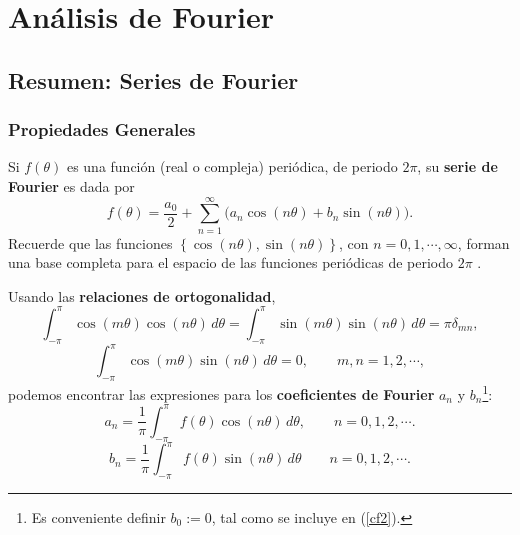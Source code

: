 \chapter{Análisis de Fourier}
\setcounter{page}{1}


\section{Resumen: Series de Fourier}

\subsection{Propiedades Generales} Si $f(\theta)$ es una función (real o compleja) periódica, de periodo $2\pi$, su \textbf{serie de Fourier} es dada por
\begin{equation}\label{sf1}
 f(\theta) =\frac{a_0}{2}  +\sum_{n=1}^\infty 
\big(a_n\cos(n\theta) + b_n\sin(n\theta)\big).
\end{equation}
Recuerde que las funciones $\left\lbrace\cos(n\theta),\sin(n\theta)\right\rbrace$, con $n=0,1,\cdots,\infty$, forman una base completa para el espacio de las funciones periódicas de periodo $2\pi$ \cite{Arfken}.

Usando las \textbf{relaciones de ortogonalidad}, 
\begin{equation}
\int_{-\pi}^\pi\cos(m\theta)\cos(n\theta)\,d\theta=\int_{-\pi}^\pi\sin(m\theta)\sin(n\theta)\,d\theta=\pi\delta_{mn},\label{eq:ortogo-sin-cos}
\end{equation}
\begin{equation}
\int_{-\pi}^\pi\cos(m\theta)\sin(n\theta)\,d\theta=0, \qquad m,n = 1,2,\cdots,
\end{equation}
podemos encontrar las expresiones para los \textbf{coeficientes de Fourier} $a_n$ y $b_n$\footnote{Es conveniente definir $b_0:=0$, tal como se incluye en (\ref{cf2}).}:
\begin{equation}\label{cf1}
a_n =\frac{1}{\pi}\int_{-\pi}^\pi f(\theta)\cos(n\theta)\,d\theta, \qquad n= 0, 1, 2,\cdots .
\end{equation}
\begin{equation}\label{cf2}
b_n =\frac{1}{\pi}\int_{-\pi}^\pi f(\theta)\sin(n\theta)\,d\theta  \qquad n= 0, 1, 2,\cdots .
\end{equation}

